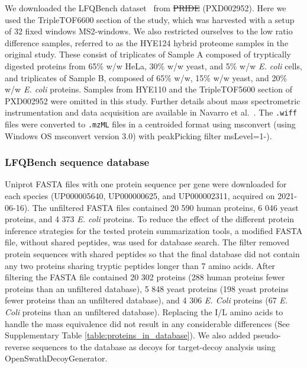 \documentclass[10pt,letterpaper]{article}
\providecommand{\DIFadd}[1]{{\protect\color{blue}\uwave{#1}}} %
\providecommand{\DIFdel}[1]{{\protect\color{red}\sout{#1}}}                      %
\providecommand{\DIFaddbegin}{} %
\providecommand{\DIFaddend}{} %
\providecommand{\DIFdelbegin}{} %
\providecommand{\DIFdelend}{} %
\newcommand{\DIFscaledelfig}{0.5}
\newlength{\DIFdelgraphicswidth} %
\newlength{\DIFdelgraphicsheight} %
\newcommand{\DIFaddincludegraphics}[2][]{{\color{blue}\fbox{\DIFOincludegraphics[#1]{#2}}}} %
\newcommand{\DIFdelincludegraphics}[2][]{%
\sbox{\DIFdelgraphicsbox}{\DIFOincludegraphics[#1]{#2}}%
\settoboxwidth{\DIFdelgraphicswidth}{\DIFdelgraphicsbox} %
\settoboxtotalheight{\DIFdelgraphicsheight}{\DIFdelgraphicsbox} %
\scalebox{\DIFscaledelfig}{%
\parbox[b]{\DIFdelgraphicswidth}{\usebox{\DIFdelgraphicsbox}\\[-\baselineskip] \rule{\DIFdelgraphicswidth}{0em}}\llap{\resizebox{\DIFdelgraphicswidth}{\DIFdelgraphicsheight}{%
\setlength{\unitlength}{\DIFdelgraphicswidth}%
\begin{picture}(1,1)%
\thicklines\linethickness{2pt} %
{\color[rgb]{1,0,0}\put(0,0){\framebox(1,1){}}}%
{\color[rgb]{1,0,0}\put(0,0){\line( 1,1){1}}}%
{\color[rgb]{1,0,0}\put(0,1){\line(1,-1){1}}}%
\end{picture}%
}\hspace*{3pt}}} %
} %
\DeclareRobustCommand{\DIFaddbegin}{\DIFOaddbegin \let\includegraphics\DIFaddincludegraphics} %
\DeclareRobustCommand{\DIFaddend}{\DIFOaddend \let\includegraphics\DIFOincludegraphics} %
\DeclareRobustCommand{\DIFdelbegin}{\DIFOdelbegin \let\includegraphics\DIFdelincludegraphics} %
\DeclareRobustCommand{\DIFdelend}{\DIFOaddend \let\includegraphics\DIFOincludegraphics} %
\begin{document}
We downloaded the LFQBench dataset~\cite{navarro2016multicenter} from \DIFdelbegin \DIFdel{PRIDE }\DIFdelend \DIFaddbegin \DIFadd{ProteomeXchange }\DIFaddend (PXD002952). Here we used the TripleTOF6600 section of the study, which was harvested with a setup of 32 fixed windows MS2-windows. We also restricted ourselves to the low ratio difference samples, referred to as the HYE124 hybrid proteome samples in the original study. These consist of triplicates of Sample A composed of tryptically digested proteins from 65\% w/w HeLa, 30\% w/w yeast, and 5\% w/w \textit{E. coli} cells, and triplicates of Sample B, composed of 65\% w/w, 15\% w/w yeast, and 20\% w/w \textit{E. coli} proteins. Samples from HYE110 and the TripleTOF5600 section of PXD002952 were omitted in this study. Further details about mass spectrometric instrumentation and data acquisition are available in Navarro et al.~\cite{navarro2016multicenter}. The \verb|.wiff| files were converted to \verb|.mzML| files in a centroided format using msconvert (using Windows OS msconvert version 3.0) with peakPicking filter msLevel=1-). 

\subsubsection*{LFQBench sequence database}

Uniprot FASTA files with one protein sequence per gene were downloaded for each species (UP000005640, UP000000625, and UP000002311, acquired on 2021-06-16). The unfiltered FASTA files contained 20 590 human proteins, 6 046 yeast proteins, and 4 373 \textit{E. coli} proteins. To reduce the effect of the different protein inference strategies for the tested protein summarization tools, a modified FASTA file, without shared peptides, was used for database search. The filter removed protein sequences with shared peptides so that the final database did not contain any two proteins sharing tryptic peptides longer than 7 amino acids. After filtering the FASTA file contained 20 302 proteins (288 human proteins fewer proteins than \DIFaddbegin \DIFadd{in }\DIFaddend an unfiltered database), 5 848 yeast proteins (198 yeast proteins fewer proteins than \DIFaddbegin \DIFadd{in }\DIFaddend an unfiltered database), and 4 306 \textit{E. Coli} proteins (67 \textit{E. Coli} proteins than \DIFaddbegin \DIFadd{in }\DIFaddend an unfiltered database). Replacing the I/L amino acids to handle the mass equivalence did not result in any considerable differences (See Supplementary Table \ref{table:proteins_in_database}). We also added pseudo-reverse sequences to the database as decoys for target-decoy analysis using OpenSwathDecoyGenerator. 
\end{document}
